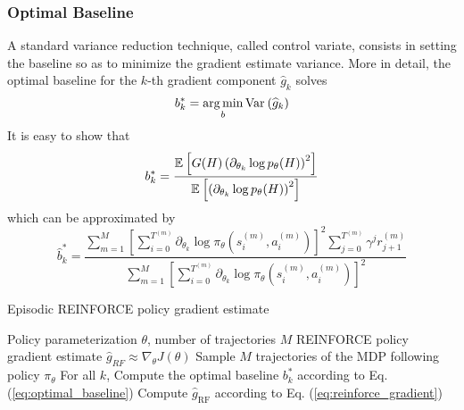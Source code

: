 \subsubsection{Optimal Baseline}
A standard variance reduction technique, called control variate, consists in setting the baseline so as to minimize the gradient estimate variance. More in detail, the optimal baseline for the $k$-th gradient component $\widehat{g}_{k}$ solves
\begin{equation*}
	b_k^* = \operatorname*{arg\,min}_b \text{Var}_{}\left( \widehat{g}_{k} \right)
\end{equation*} 
It is easy to show that 
\begin{equation*}
	b_k^* = \frac{\mathbb{E}_{}\left[ G(H) \left(\partial_{\theta_k} \log p_\theta(H)\right)^2   \right]}{\mathbb{E}_{}\left[ \left(\partial_{\theta_k} \log p_\theta(H)\right)^2 \right]}
\end{equation*}
which can be approximated by 
\begin{equation}
	\label{eq:optimal_baseline}
	\widehat{b}_k^* = \frac{\sum^{M}_{m=1} \left[ \sum_{i=0}^{T^{(m)}} 
		\partial_{\theta_k} \log \pi_\theta\left(s_i^{(m)}, a_i^{(m)}\right) \right]^2 
		\sum^{T^{(m)}}_{j=0} \gamma^j r_{j+1}^{(m)}}{\sum^{M}_{m=1} \left[ \sum_{i=0}^{T^{(m)}} \partial_{\theta_k} \log \pi_\theta\left(s_i^{(m)}, a_i^{(m)}\right) \right]^2}
\end{equation}

\begin{algorithm}[t]
	\caption{Episodic REINFORCE policy gradient estimate}
	\label{algo:reinforce}
	\begin{algorithmic}[1]
		\Require Policy parameterization $\theta$, number of trajectories $M$
		\Ensure REINFORCE policy gradient estimate $\widehat{g}_{RF} \approx \nabla_\theta J(\theta)$
		\State Sample $M$ trajectories of the MDP following policy $\pi_\theta$
		\State For all $k$, Compute the optimal baseline $b_k^*$ according to Eq. (\ref{eq:optimal_baseline})
		\State Compute $\widehat{g}_{\text{RF}}$ according to Eq. (\ref{eq:reinforce_gradient})
	\end{algorithmic}
\end{algorithm}

